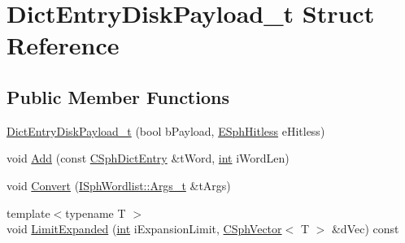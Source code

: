 \hypertarget{structDictEntryDiskPayload__t}{\section{Dict\-Entry\-Disk\-Payload\-\_\-t Struct Reference}
\label{structDictEntryDiskPayload__t}
}
\subsection*{Public Member Functions}
\begin{DoxyCompactItemize}
\item 
\hyperlink{structDictEntryDiskPayload__t_a82b06cbb3e2b34685b86ac15daa54970}{Dict\-Entry\-Disk\-Payload\-\_\-t} (bool b\-Payload, \hyperlink{sphinx_8h_a1920852c5151009d65cf2bc8204a685b}{E\-Sph\-Hitless} e\-Hitless)
\item 
void \hyperlink{structDictEntryDiskPayload__t_aa46234a7be7b656920c95e36f6b998de}{Add} (const \hyperlink{structCSphDictEntry}{C\-Sph\-Dict\-Entry} \&t\-Word, \hyperlink{sphinxexpr_8cpp_a4a26e8f9cb8b736e0c4cbf4d16de985e}{int} i\-Word\-Len)
\item 
void \hyperlink{structDictEntryDiskPayload__t_a06b9323c6ed28529de52bcc01a412959}{Convert} (\hyperlink{structISphWordlist_1_1Args__t}{I\-Sph\-Wordlist\-::\-Args\-\_\-t} \&t\-Args)
\item 
{\footnotesize template$<$typename T $>$ }\\void \hyperlink{structDictEntryDiskPayload__t_a3c3257783ca138acc90871d072cb4dee}{Limit\-Expanded} (\hyperlink{sphinxexpr_8cpp_a4a26e8f9cb8b736e0c4cbf4d16de985e}{int} i\-Expansion\-Limit, \hyperlink{classCSphVector}{C\-Sph\-Vector}$<$ T $>$ \&d\-Vec) const 
\end{DoxyCompactItemize}
